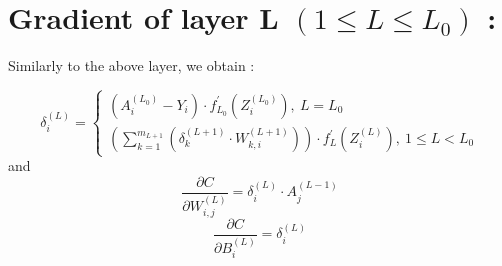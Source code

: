 \documentclass{article}
\begin{document}
    \section*{Gradient of layer L $(1 \leq L \leq L_0)$ :}
    Similarly to the above layer, we obtain :

    \[
        \delta^{(L)}_i = 
        \begin{cases}
            \left(A^{(L_0)}_i - Y_i\right) \cdot f^{\prime}_{L_0}\left(Z^{(L_0)}_i\right), \ L = L_0\\
            \left(
                \sum_{k = 1}^{m_{L+1}}\left(
                    \delta^{(L + 1)}_k \cdot W^{(L + 1)}_{k, i}
                \right) 
            \right) \cdot f_{L}^{\prime}\left(Z^{(L)}_i\right), \ 1 \leq L < L_0
        \end{cases}
    \]
    and
    \[
        \frac{\partial C}{\partial W^{(L)}_{i, j}} = 
        \delta^{(L)}_i \cdot
        A^{(L-1)}_j
    \]
    \[
        \frac{\partial C}{\partial B^{(L)}_{i}} = 
        \delta^{(L)}_i
    \]
\end{document}

